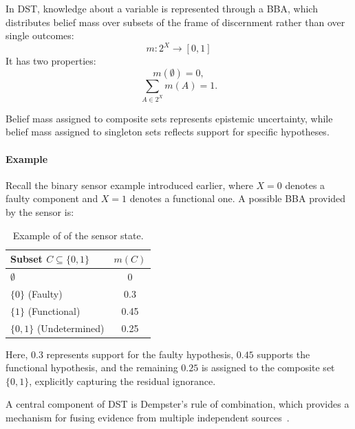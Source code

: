 In \ac{DST}, knowledge about a variable is represented through a \ac{BBA}, which distributes belief mass over subsets of the frame of discernment rather than over single outcomes: 
\[
m: 2^{X} \rightarrow [0,1]
\]
It has two properties:
\[
m(\emptyset)=0,
\]
\[
\sum_{A\in 2^{X}} m(A)=1.
\]

Belief mass assigned to composite sets represents epistemic uncertainty, while belief mass assigned to singleton sets reflects support for specific hypotheses. 

\paragraph{Example}
Recall the binary sensor example introduced earlier, where 
\(X=0\) denotes a faulty component and \(X=1\) denotes a functional one.  
A possible \ac{BBA} provided by the sensor is:

\begin{table}[H]
\centering
\begin{tabular}{lc}
\hline
Subset $C \subseteq \{0,1\}$ & $m(C)$ \\
\hline
$\emptyset$ & 0\footnotemark \\
$\{0\}$ (Faulty) & 0.3 \\
$\{1\}$ (Functional) & 0.45 \\
$\{0,1\}$ (Undetermined) & 0.25 \\
\hline
\end{tabular}
\caption{Example of  of the sensor state.}
\label{tab:dst_sensor_example}
\end{table}

Here, \(0.3\) represents support for the faulty hypothesis, \(0.45\) supports the functional hypothesis, and the remaining \(0.25\)
is assigned to the composite set $\{0,1\}$, explicitly capturing
the residual ignorance.

A central component of \ac{DST} is Dempster’s rule of combination, which provides a mechanism for fusing evidence from multiple independent sources~\cite{SHAFER201626,josang2012dempster}.

